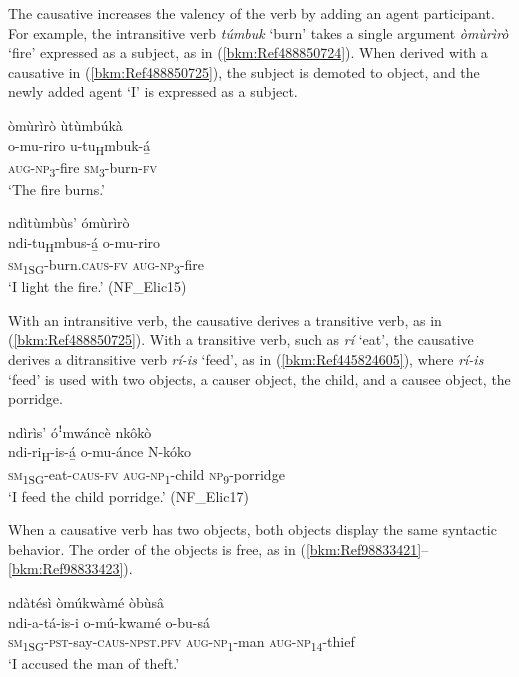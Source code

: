 The causative increases the valency of the verb by adding an agent participant. For example, the intransitive verb \textit{túmbuk} ‘burn’ takes a single argument \textit{òmùrìrò} ‘fire’ expressed as a subject, as in (\ref{bkm:Ref488850724}). When derived with a causative in (\ref{bkm:Ref488850725}), the subject is demoted to object, and the newly added agent ‘I’ is expressed as a subject.

\ea
\label{bkm:Ref488850724}
òmùrìrò ùtùmbúkà\\
\gll o-mu-riro  u-tu\textsubscript{H}mbuk-á̲\\
\textsc{aug}-\textsc{np}\textsubscript{3}-fire  \textsc{sm}\textsubscript{3}-burn-\textsc{fv}\\
\glt ‘The fire burns.’
\z

\ea
\label{bkm:Ref488850725}
ndìtùmbùs’ ómùrìrò\\
\gll ndi-tu\textsubscript{H}mbus-á̲    o-mu-riro\\
\textsc{sm}\textsubscript{1SG}-burn.\textsc{caus}-\textsc{fv}  \textsc{aug}-\textsc{np}\textsubscript{3}-fire\\
\glt ‘I light the fire.’ (NF\_Elic15)
\z

With an intransitive verb, the causative derives a transitive verb, as in (\ref{bkm:Ref488850725}). With a transitive verb, such as \textit{rí} ‘eat’, the causative derives a ditransitive verb \textit{rí-is} ‘feed’, as in (\ref{bkm:Ref445824605}), where \textit{rí-is} ‘feed’ is used with two objects, a causer object, the child, and a causee object, the porridge.

\ea
\label{bkm:Ref445824605}
ndìrìs’ óꜝmwáncè nkôkò\\
\gll ndi-ri\textsubscript{H}-is-á̲    o-mu-ánce    N-kóko\\
\textsc{sm}\textsubscript{1SG}-eat-\textsc{caus}-\textsc{fv}  \textsc{aug}-\textsc{np}\textsubscript{1}-child  \textsc{np}\textsubscript{9}-porridge\\
\glt ‘I feed the child porridge.’ (NF\_Elic17)
\z

When a causative verb has two objects, both objects display the same syntactic behavior. The order of the objects is free, as in (\ref{bkm:Ref98833421}--\ref{bkm:Ref98833423}).

\ea
\label{bkm:Ref98833421}
ndàtésì òmúkwàmé òbùsâ\\
\gll ndi-a-tá-is-i        o-mú-kwamé  o-bu-sá\\
\textsc{sm}\textsubscript{1SG}-\textsc{pst}-say-\textsc{caus}-\textsc{npst}.\textsc{pfv}  \textsc{aug}-\textsc{np}\textsubscript{1}-man  \textsc{aug}-\textsc{np}\textsubscript{14}-thief\\
\glt ‘I accused the man of theft.’
\z

